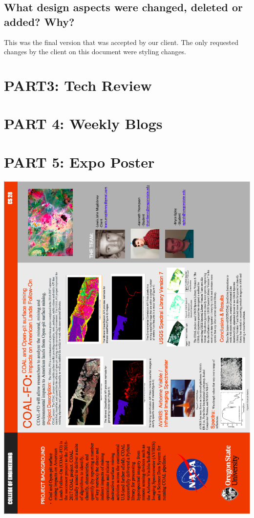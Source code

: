 \documentclass[onecolumn, draftclsnofoot,10pt, compsoc]{IEEEtran}
\begin{document}


\subsection{What design aspects were changed, deleted or added? Why? }
This was the final version that was accepted by our client. The only requested changes by the client on this document were styling changes. 
\section{PART3: Tech Review}


\section{PART 4: Weekly Blogs}



\section{PART 5: Expo Poster}
\includegraphics[width=\textwidth,height=\textheight,keepaspectratio]{Poster.png}
\end{document}
